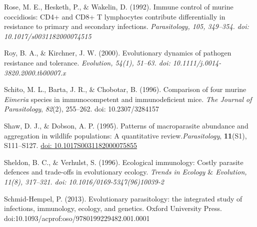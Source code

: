 \documentclass[12pt]{article}
\renewcommand{\_}{\kern-1.5pt\textunderscore\kern-1.5pt}
\begin{document}
\begin{FlushLeft}
Rose, M. E., Hesketh, P., $\&$  Wakelin, D. (1992). Immune control of murine coccidiosis: CD4+ and CD8+ T lymphocytes contribute differentially in resistance to primary and secondary infections. \textit{Parasitology, 105, 349–354. doi: 10.1017/s0031182000074515}
\end{FlushLeft}\par

\begin{FlushLeft}
Roy, B. A., $\&$  Kirchner, J. W. (2000). Evolutionary dynamics of pathogen resistance and tolerance. \textit{Evolution, 54(1), 51–63. doi: 10.1111/j.0014-3820.2000.tb00007.x}
\end{FlushLeft}\par

\begin{FlushLeft}
Schito,\textcolor[HTML]{00000A}{ M. L., Barta, J. R., $\&$  Chobotar, B. (1996). Comparison of four murine \textit{Eimeria} species in immunocompetent and immunodeficient mice. \textit{The Journal of Parasitology}, \textit{82}(2), 255–262. doi: 10.2307/3284157}
\end{FlushLeft}\par

\begin{FlushLeft}
\textcolor[HTML]{00000A}{Shaw, D. J., $\&$  Dobson, A. P. (1995). Patterns of macroparasite abundance and aggregation in wildlife populations: A quantitative review.\textit{Parasitology}, \textbf{11}(S1), S111–S127. \href{https://doi.org/10.1017/S0031182000075855}{doi: 10.1017S0031182000075855}}
\end{FlushLeft}\par

\begin{FlushLeft}
Sheldon, B. C., $\&$  Verhulst, S. (1996). Ecological immunology: Costly parasite defences and trade-offs in evolutionary ecology. \textit{\textcolor[HTML]{00000A}{Trends in Ecology $\&$  Evolution, 11(8), 317–321. doi: 10.1016/0169-5347(96)10039-2 }}
\end{FlushLeft}\par

\begin{FlushLeft}
Schmid-Hempel, P. (2013). Evolutionary parasitology: the integrated study of infections, immunology, ecology, and genetics. Oxford University Press. doi:10.1093/acprof:oso/9780199229482.001.0001
\end{FlushLeft}\par
\end{document}
